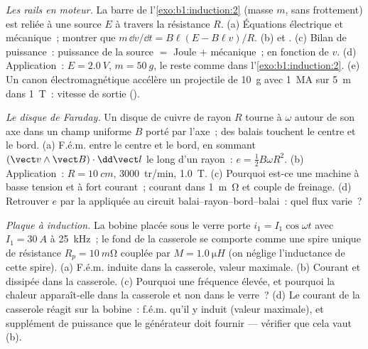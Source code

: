 \begin{exercise}[$\star\star\star$]\label{exo:b1:induction:10}
\emph{Les rails en moteur.} La barre de l'\cref{exo:b1:induction:2} (masse $m$,
sans frottement) est reliée à une source $E$ à travers la résistance $R$.
(a) Équations électrique et mécanique~; montrer que $m\,\dd v/\dd t = B\ell(E -
B\ell v)/R$. (b)  et . (c) Bilan de puissance~:
puissance de la source $=$ Joule $+$ mécanique~;  en fonction de
$v$. (d) Application~: $E = \qty{2.0}{V}$, $m = \qty{50}{g}$, le reste comme
dans l'\cref{exo:b1:induction:2}. (e) Un canon électromagnétique accélère un
projectile de \qty{10}{g} avec \qty{1}{MA} sur \qty{5}{m} dans \qty{1}{T}~:
vitesse de sortie ().
\end{exercise}

\begin{exercise}[$\star\star\star$]\label{exo:b1:induction:11}
\emph{Le disque de Faraday.} Un disque de cuivre de rayon $R$ tourne à $\omega$
autour de son axe dans un champ uniforme $B$ porté par l'axe~; des balais
touchent le centre et le bord. (a) F.é.m. entre le centre et le bord, en sommant $(\vect v\wedge
\vect B)\cdot\dd\vect l$ le long d'un rayon~: $e = \tfrac12B\omega R^2$. (b) Application~:
$R = \qty{10}{cm}$, \qty{3000}{tr/min}, \qty{1.0}{T}. (c) Pourquoi est-ce une
machine à basse tension et à fort courant~; courant dans \qty{1}{m\ohm} et
couple de freinage. (d) Retrouver $e$ par la  appliquée au
circuit balai--rayon--bord--balai~: quel flux varie~?
\end{exercise}

\begin{exercise}[$\star\star\star$]\label{exo:b1:induction:12}
\emph{Plaque à induction.} La bobine placée sous le verre porte $i_1 =
I_1\cos\omega t$ avec $I_1 = \qty{30}{A}$ à \qty{25}{kHz}~; le fond de la
casserole se comporte comme une spire unique de résistance $R_p = \qty{10}{m\ohm}$
couplée par $M = \qty{1.0}{\micro H}$ (on néglige l'inductance de cette spire).
(a) F.é.m. induite dans la casserole, valeur maximale. (b) Courant et  dissipée dans la casserole. (c) Pourquoi une fréquence élevée, et
pourquoi la chaleur apparaît-elle dans la casserole et non dans le verre~?
(d) Le courant de la casserole réagit sur la bobine~: f.é.m. qu'il y induit
(valeur maximale), et supplément de puissance que le générateur doit fournir
--- vérifier que cela vaut (b).
\end{exercise}

